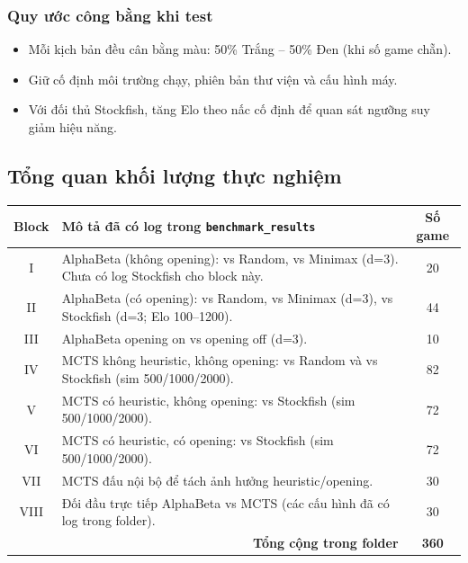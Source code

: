 \subsubsection{Quy ước công bằng khi test}

\begin{itemize}
    \item Mỗi kịch bản đều cân bằng màu: 50\% Trắng -- 50\% Đen (khi số game chẵn).
    \item Giữ cố định môi trường chạy, phiên bản thư viện và cấu hình máy.
    \item Với đối thủ Stockfish, tăng Elo theo nấc cố định để quan sát ngưỡng suy giảm hiệu năng.
\end{itemize}

\subsection{Tổng quan khối lượng thực nghiệm}

\begin{center}
\small
\begin{tabular}{|c|p{9.0cm}|c|}
\hline
\textbf{Block} & \textbf{Mô tả đã có log trong \texttt{benchmark\_results}} & \textbf{Số game} \\
\hline
I & AlphaBeta (không opening): vs Random, vs Minimax (d=3). Chưa có log Stockfish cho block này. & 20 \\
\hline
II & AlphaBeta (có opening): vs Random, vs Minimax (d=3), vs Stockfish (d=3; Elo 100--1200). & 44 \\
\hline
III & AlphaBeta opening on vs opening off (d=3). & 10 \\
\hline
IV & MCTS không heuristic, không opening: vs Random và vs Stockfish (sim 500/1000/2000). & 82 \\
\hline
V & MCTS có heuristic, không opening: vs Stockfish (sim 500/1000/2000). & 72 \\
\hline
VI & MCTS có heuristic, có opening: vs Stockfish (sim 500/1000/2000). & 72 \\
\hline
VII & MCTS đấu nội bộ để tách ảnh hưởng heuristic/opening. & 30 \\
\hline
VIII & Đối đầu trực tiếp AlphaBeta vs MCTS (các cấu hình đã có log trong folder). & 30 \\
\hline
\multicolumn{2}{|r|}{\textbf{Tổng cộng trong folder}} & \textbf{360} \\
\hline
\end{tabular}
\end{center}

